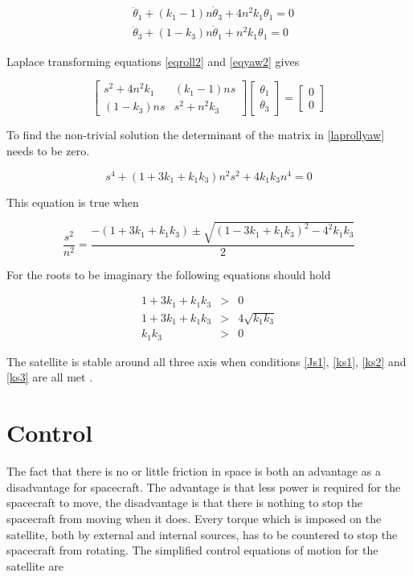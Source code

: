 \begin{eqnarray}
&\ddot{\theta}_1 + \left(k_1-1\right)n\dot{\theta}_3 + 4n^2k_1\theta_1 = 0 \label{eqroll2}\\
&\ddot{\theta}_3 + \left(1 - k_3\right)n\dot{\theta}_1 + n^2k_1\theta_1 = 0 \label{eqyaw2}
\end{eqnarray}

Laplace transforming equations \ref{eqroll2} and \ref{eqyaw2} gives

\begin{equation}
\begin{bmatrix}
s^2+4n^2k_1 & (k_1-1)ns \\ 
(1-k_3)ns & s^2+n^2k_3
\end{bmatrix} \begin{bmatrix}\theta_1 \\ \theta_3 \end{bmatrix} = \begin{bmatrix}0 \\ 0 \end{bmatrix}
\label{laprollyaw}
\end{equation}

To find the non-trivial solution the determinant of the matrix in \ref{laprollyaw} needs to be zero.

\begin{equation}
s^4 +(1+3k_1 + k_1k_3)n^2s^2 + 4k_1k_3n^4 = 0
\label{detmatr}
\end{equation}

This equation is true when

\begin{equation}
\frac{s^2}{n^2} = \frac{-(1+3k_1 + k_1k_3) \pm \sqrt{(1-3k_1+k_1k_3)^2 - 4^2k_1k_3}}{2}
\label{detmatrsol}
\end{equation}

For the roots to be imaginary the following equations should hold

\begin{eqnarray}
1+3k_1+k_1k_3 &>& 0 \label{ks1} \\
1+3k_1+k_1k_3 &>& 4\sqrt{k_1k_3} \label{ks2} \\
k_1k_3 &>& 0 \label{ks3}
\end{eqnarray}

The satellite is stable around all three axis when conditions \ref{Js1}, \ref{ks1}, \ref{ks2} and \ref{ks3} are all met \cite{chu13}.

\section{Control}
\label{sec:SCcont}
The fact that there is no or little friction in space is both an advantage as a disadvantage for spacecraft. The advantage is that less power is required for the spacecraft to move, the disadvantage is that there is nothing to stop the spacecraft from moving when it does. Every torque which is imposed on the satellite, both by external and internal sources, has to be countered to stop the spacecraft from rotating. The simplified control equations of motion for the satellite are

